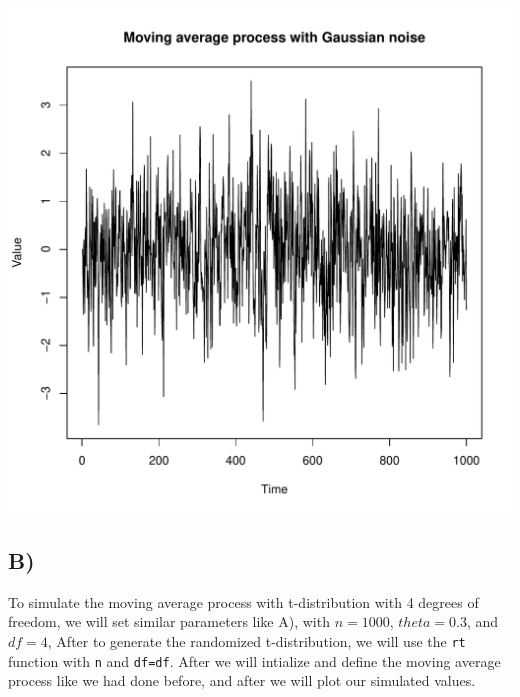 \documentclass[11pt, letterpaper]{article}
\begin{document}
\begin{file}[q4a.r]
	
\end{file}
\begin{center}
	\includegraphics[scale=0.47]{code/q4a}
\end{center}

\subsection*{B)}
To simulate the moving average process with t-distribution with 4 degrees of
freedom, we will set similar
parameters like A), with $n=1000$, $theta = 0.3$, and $df=4$, After to generate
the randomized t-distribution,
we will use the \verb|rt| function with \verb|n| and \verb|df=df|. After we
will intialize and define the moving
average process like we had done before, and after we will plot our simulated
values.

\begin{file}[q4b.r]
	
\end{file}
\end{document}
